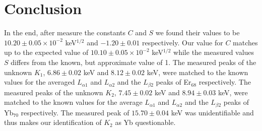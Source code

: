\documentclass[prb,preprint]{revtex4-1}
\begin{document}
\section{Conclusion}

In the end, after measure the constants $C$ and $S$ we found their values to be $10.20\pm0.05\times10^{-2}$ keV$^{1/2}$ and $-1.20\pm0.01$ respectively. Our value for $C$ matches up to the expected value of $10.10\pm0.05\times10^{-2}$ keV$^{1/2}$ while the measured values $S$ differs from the known, but approximate value of 1. The measured peaks of the unknown $K_1$, $6.86\pm0.02$ keV and $8.12\pm0.02$ keV, were matched to the known values for the averaged $L_{\alpha1}$ and $L_{\alpha2}$ and the $L_{\beta2}$ peaks of Er$_{68}$ respectively.  The measured peaks of the unknown $K_2$, $7.45\pm0.02$ keV and $8.94\pm0.03$ keV, were matched to the known values for the average $L_{\alpha1}$ and $L_{\alpha2}$ and the $L_{\beta2}$ peaks of Yb$_{70}$ respectively. The measured peak of $15.70\pm0.04$ keV was unidentifiable and thus makes our identification of $K_2$ as Yb questionable.
\end{document}
